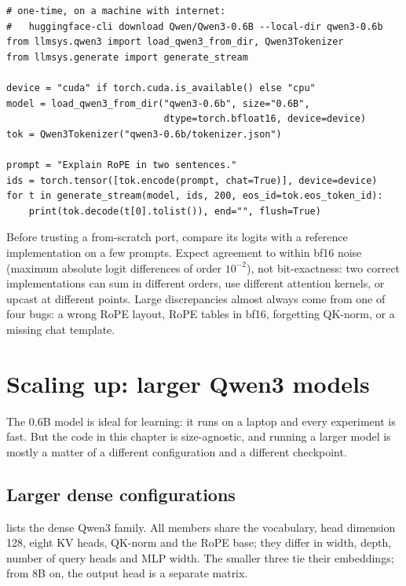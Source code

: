 \begin{lstlisting}[caption={Loading Qwen3-0.6B and streaming a reply.},label={lst:modern:use}]
# one-time, on a machine with internet:
#   huggingface-cli download Qwen/Qwen3-0.6B --local-dir qwen3-0.6b
from llmsys.qwen3 import load_qwen3_from_dir, Qwen3Tokenizer
from llmsys.generate import generate_stream

device = "cuda" if torch.cuda.is_available() else "cpu"
model = load_qwen3_from_dir("qwen3-0.6b", size="0.6B",
                            dtype=torch.bfloat16, device=device)
tok = Qwen3Tokenizer("qwen3-0.6b/tokenizer.json")

prompt = "Explain RoPE in two sentences."
ids = torch.tensor([tok.encode(prompt, chat=True)], device=device)
for t in generate_stream(model, ids, 200, eos_id=tok.eos_token_id):
    print(tok.decode(t[0].tolist()), end="", flush=True)
\end{lstlisting}

Before trusting a from-scratch port, compare its logits with a reference implementation on a few
prompts. Expect agreement to within bf16 noise (maximum absolute logit differences of order
$10^{-2}$), not bit-exactness: two correct implementations can sum in different orders, use different
attention kernels, or upcast at different points. Large discrepancies almost always come from one of
four bugs: a wrong RoPE layout, RoPE tables in bf16, forgetting QK-norm, or a missing chat template.

\section{Scaling up: larger Qwen3 models}\label{sec:modern:larger}

The 0.6B model is ideal for learning: it runs on a laptop and every experiment is fast. But the code
in this chapter is size-agnostic, and running a larger model is mostly a matter of a different
configuration and a different checkpoint.

\subsection{Larger dense configurations}
 lists the dense Qwen3 family. All members share the vocabulary, head
dimension 128, eight KV heads, QK-norm and the RoPE base; they differ in width, depth, number of query
heads and MLP width. The smaller three tie their embeddings; from 8B on, the output head is a separate
matrix.


